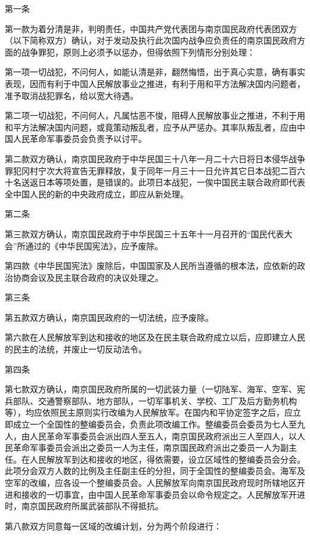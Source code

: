 \begin{maonote}
第一条

第一款为着分清是非，判明责任，中国共产党代表团与南京国民政府代表团双方（以下简称双方）确认，对于发动及执行此次国内战争应负责任的南京国民政府方面的战争罪犯，原则上必须予以惩办，但得依照下列情形分别处理：

第一项一切战犯，不问何人，如能认清是非，翻然悔悟，出于真心实意，确有事实表现，因而有利于中国人民解放事业之推进，有利于用和平方法解决国内问题者，准予取消战犯罪名，给以宽大待遇。

第二项一切战犯，不问何人，凡属怙恶不悛，阻碍人民解放事业之推进，不利于用和平方法解决国内问题，或竟策动叛乱者，应予从严惩办。其率队叛乱者，应由中国人民革命军事委员会负责予以讨平。

第二款双方确认，南京国民政府于中华民国三十八年一月二十六日将日本侵华战争罪犯冈村宁次大将宣告无罪释放，复于同年一月三十一日允许其它日本战犯二百六十名送返日本等项处置，是错误的。此项日本战犯，一俟中国民主联合政府即代表全中国人民的新的中央政府成立，即应从新处理。

第二条

第三款双方确认，南京国民政府于中华民国三十五年十一月召开的“国民代表大会”所通过的《中华民国宪法》，应予废除。

第四款《中华民国宪法》废除后，中国国家及人民所当遵循的根本法，应依新的政治协商会议及民主联合政府的决议处理之。

第三条

第五款双方确认，南京国民政府的一切法统，应予废除。

第六款在人民解放军到达和接收的地区及在民主联合政府成立以后，应即建立人民的民主的法统，并废止一切反动法令。

第四条

第七款双方确认，南京国民政府所属的一切武装力量（一切陆军、海军、空军、宪兵部队、交通警察部队、地方部队，一切军事机关、学校、工厂及后方勤务机构等），均应依照民主原则实行改编为人民解放军。在国内和平协定签字之后，应立即成立一个全国性的整编委员会，负责此项改编工作。整编委员会委员为七人至九人，由人民革命军事委员会派出四人至五人，南京国民政府派出三人至四人，以人民革命军事委员会派出之委员一人为主任，南京国民政府派出之委员一人为副主任。在人民解放军到达和接收的地区，得依需要，设立区域性的整编委员会分会。此项分会双方人数的比例及主任副主任的分担，同于全国性的整编委员会。海军及空军的改编，应各设一个整编委员会。人民解放军向南京国民政府现时所辖地区开进和接收的一切事宜，由中国人民革命军事委员会以命令规定之。人民解放军开进时，南京国民政府所属武装部队不得抵抗。

第八款双方同意每一区域的改编计划，分为两个阶段进行：


\end{maonote}
